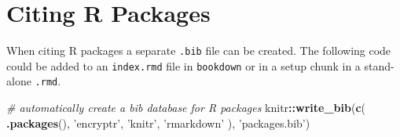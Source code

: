 \documentclass[]{book}
\newenvironment{Shaded}{\begin{snugshade}}{\end{snugshade}}
\newcommand{\CommentTok}[1]{\textcolor[rgb]{0.56,0.35,0.01}{\textit{#1}}}
\newcommand{\KeywordTok}[1]{\textcolor[rgb]{0.13,0.29,0.53}{\textbf{#1}}}
\newcommand{\NormalTok}[1]{#1}
\newcommand{\OperatorTok}[1]{\textcolor[rgb]{0.81,0.36,0.00}{\textbf{#1}}}
\newcommand{\StringTok}[1]{\textcolor[rgb]{0.31,0.60,0.02}{#1}}
\begin{document}
\hypertarget{citing-r-packages}{%
\section{Citing R Packages}\label{citing-r-packages}}

When citing R packages a separate \texttt{.bib} file can be created. The following code could be added to an \texttt{index.rmd} file in \texttt{bookdown} or in a setup chunk in a stand-alone \texttt{.rmd}.

\begin{Shaded}
\begin{Highlighting}[]
\CommentTok{# automatically create a bib database for R packages}
\NormalTok{knitr}\OperatorTok{::}\KeywordTok{write_bib}\NormalTok{(}\KeywordTok{c}\NormalTok{(}
  \KeywordTok{.packages}\NormalTok{(), }\StringTok{'encryptr'}\NormalTok{, }\StringTok{'knitr'}\NormalTok{, }\StringTok{'rmarkdown'}
\NormalTok{), }\StringTok{'packages.bib'}\NormalTok{)}
\end{Highlighting}
\end{Shaded}


\end{document}
